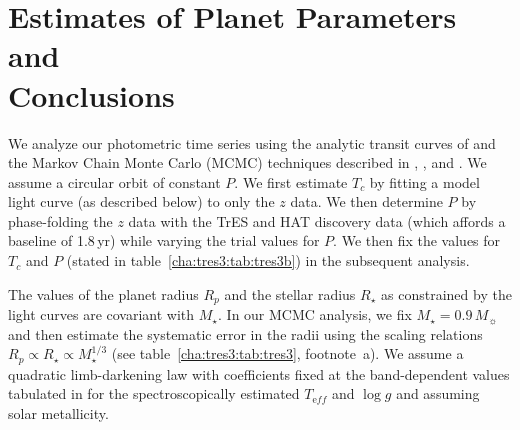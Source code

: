 \section[Estimates of Planet Parameters and Conclusions]{Estimates of Planet Parameters and \\ Conclusions}\label{cha:tres3:sec:discuss}

We analyze our photometric time series using the analytic transit curves of \citet{Mandel_Agol:apjl:2002a} and the Markov Chain Monte Carlo (MCMC) techniques described in \citet{Holman_Winn_Latham:apj:2006a}, \citet{Charbonneau_Winn_Everett:apj:2007a}, and \citet*{Winn_Holman_Roussanova:apj:2007a}.
We assume a circular orbit of constant $P$.
We first estimate $T_c$ by fitting a model light curve (as described below) to only the $z$ data.
We then determine $P$ by phase-folding the $z$ data with the TrES and HAT discovery data (which affords a baseline of 1.8\,yr) while varying the trial values for $P$.
We then fix the values for $T_c$ and $P$ (stated in table~\ref{cha:tres3:tab:tres3b}) in the subsequent analysis.

The values of the planet radius $R_p$ and the stellar radius $R_{\star}$ as constrained by the light curves are covariant with $M_{\star}$.
In our MCMC analysis, we fix $M_{\star} = 0.9\,M_{\sun}$ and then estimate the systematic error in the radii using the scaling relations $R_p \propto R_{\star} \propto M_{\star}^{1/3}$ (see table~\ref{cha:tres3:tab:tres3}, footnote~a).
We assume a quadratic limb-darkening law with coefficients fixed at the band-dependent values tabulated in \citet{Claret:aa:2000a, Claret:aa:2004a} for the spectroscopically estimated $T_{\mathrm eff}$ and $\log{g}$ and assuming solar metallicity.

